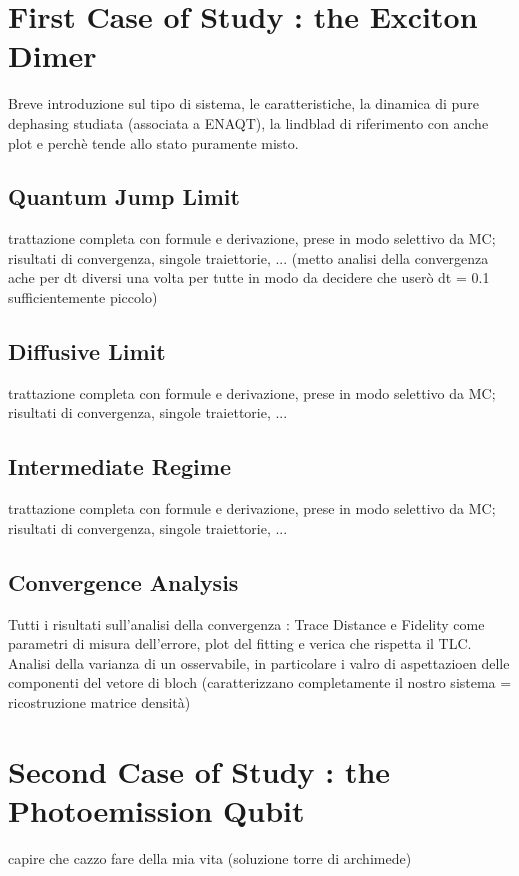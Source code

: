 \documentclass[a4paper,12pt]{article}
\begin{document}
	\section{First Case of Study : the Exciton Dimer}
	\label{sec:Exciton_Dimer}
	Breve introduzione sul tipo di sistema, le caratteristiche, la dinamica di pure dephasing studiata (associata a ENAQT), la lindblad di riferimento con anche plot e perchè tende allo stato puramente misto.
	\subsection{Quantum Jump Limit} 
	\label{sub:QJ_limit_Exc}
	trattazione completa con formule e derivazione, prese in modo selettivo da MC; risultati di convergenza, singole traiettorie, ...
	(metto analisi della convergenza ache per dt diversi una volta per tutte in modo da decidere che userò dt = 0.1 sufficientemente piccolo)
	\subsection{Diffusive Limit} 
	\label{sub:Diffusive_limit_Exc}
	trattazione completa con formule e derivazione, prese in modo selettivo da MC; risultati di convergenza, singole traiettorie, ...
	
	\subsection{Intermediate Regime} 
	\label{sub:Intermediate_Regime_Exc}
	trattazione completa con formule e derivazione, prese in modo selettivo da MC; risultati di convergenza, singole traiettorie, ...
	
	\subsection{Convergence Analysis}
	\label{sub:Convergence_Analysis_Exc}
	Tutti i risultati sull'analisi della convergenza : Trace Distance e Fidelity come parametri di misura dell'errore, plot del fitting e verica che rispetta il TLC. 
	Analisi della varianza di un osservabile, in particolare i valro di aspettazioen delle componenti del vetore di bloch (caratterizzano completamente il nostro sistema = ricostruzione matrice densità)
	
	\section{Second Case of Study : the Photoemission Qubit}
	\label{sec:Photoemission_Qubit}
	capire che cazzo fare della mia vita (soluzione torre di archimede)
	
\end{document}
